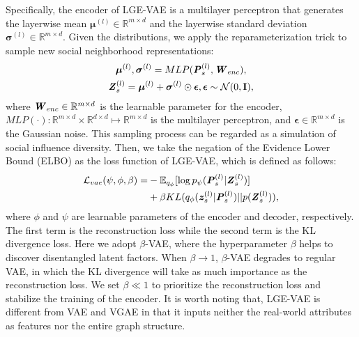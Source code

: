 \documentclass[letterpaper]{article} %
\begin{document}
Specifically, the encoder of LGE-VAE is a multilayer perceptron that generates the layerwise mean $\boldsymbol{\mu}^{(l)} \in \mathbb{R}^{m\times d}$ and the layerwise standard deviation $\boldsymbol{\sigma}^{(l)} \in \mathbb{R}^{m\times d}$. Given the distributions, we apply the reparameterization trick to sample new social neighborhood representations:
\begin{gather}
    \boldsymbol{\mu}^{(l)}, \boldsymbol{\sigma}^{(l)} = MLP(\textbf{\textit{P}}_{s}^{(l)}, \textbf{\textit{W}}_{enc}),\\
    \textbf{\textit{Z}}_s^{(l)} = \boldsymbol{\mu}^{(l)}+\boldsymbol{\sigma}^{(l)}\odot\boldsymbol{\epsilon}, \boldsymbol{\epsilon} \sim \mathcal{N}(0,\textbf{I}),
\end{gather}
where $\textbf{\textit{W}}_{enc} \in \mathbb{R}^{m\times d}$ is the learnable parameter for the encoder, $MLP(\cdot): \mathbb{R}^{m\times d}\times \mathbb{R}^{d\times d} \mapsto \mathbb{R}^{m\times d}$ is the multilayer perceptron, and $\boldsymbol{\epsilon} \in \mathbb{R}^{m\times d}$ is the Gaussian noise. This sampling process can be regarded as a simulation of social influence diversity. Then, we take the negation of the Evidence Lower Bound (ELBO) as the loss function of LGE-VAE, which is defined as follows:
\begin{equation}
    \begin{split}
        \mathcal{L}_{vae}(\psi,\phi,\beta)=
        &-\mathbb{E}_{q_\phi}[\log p_{\psi}(\textbf{\textit{P}}_s^{(l)}|\textbf{\textit{Z}}_s^{(l)})]\\
        &+\beta KL (q_{\phi}(\textbf{\textit{z}}_s^{(l)} | \textbf{\textit{P}}_s^{(l)}) || p(\textbf{\textit{Z}}_s^{(l)})),
    \end{split}
\end{equation}
where $\phi$ and $\psi$ are learnable parameters of the encoder and decoder, respectively. The first term is the reconstruction loss while the second term is the KL divergence loss. Here we adopt $\beta$-VAE, where the hyperparameter $\beta$ helps to discover disentangled latent factors. When $\beta \rightarrow 1$, $\beta$-VAE degrades to regular VAE, in which the KL divergence will take as much importance as the reconstruction loss. We set $\beta \ll 1$ to prioritize the reconstruction loss and stabilize the training of the encoder. It is worth noting that, LGE-VAE is different from VAE and VGAE in that it inputs neither the real-world attributes as features nor the entire graph structure.
\end{document}
